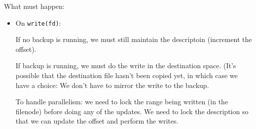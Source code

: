 \documentclass[10pt]{article}
\begin{document}
What must happen:
\begin{itemize}
\item On \texttt{write(fd)}: 

 If no backup is running, we must still maintain the descriptoin (increment the offset).

 If backup is running, we must do the write in the destination space.
 (It's possible that the destination file hasn't been copied yet, in
 which case we have a choice: We don't have to mirror the write to the
 backup.

 To handle parallelism: we need to lock the range being written (in the filenode) before doing any of the updates.
  We need to lock the description so that we can update the offset and perform the writes.

\end{itemize}
\end{document}
